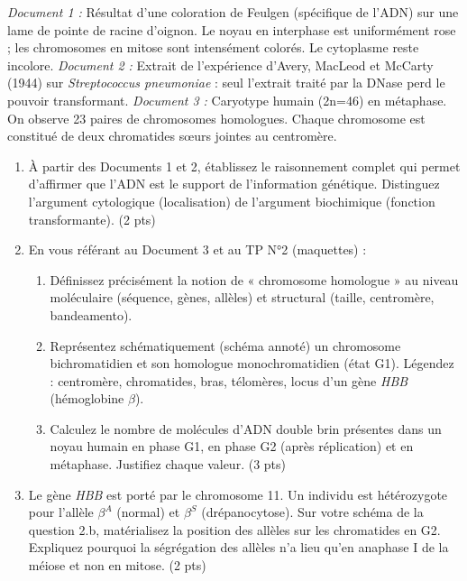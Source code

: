 \documentclass[11pt]{article}
\begin{document}
\begin{exercice}
\emph{Document 1 :} Résultat d'une coloration de Feulgen (spécifique de l'ADN) sur une lame de pointe de racine d'oignon. Le noyau en interphase est uniformément rose ; les chromosomes en mitose sont intensément colorés. Le cytoplasme reste incolore.
\emph{Document 2 :} Extrait de l'expérience d'Avery, MacLeod et McCarty (1944) sur \emph{Streptococcus pneumoniae} : seul l'extrait traité par la DNase perd le pouvoir transformant.
\emph{Document 3 :} Caryotype humain (2n=46) en métaphase. On observe 23 paires de chromosomes homologues. Chaque chromosome est constitué de deux chromatides sœurs jointes au centromère.

\begin{enumerate}
    \item À partir des Documents 1 et 2, établissez le raisonnement complet qui permet d'affirmer que l'ADN est le support de l'information génétique. Distinguez l'argument cytologique (localisation) de l'argument biochimique (fonction transformante). \hfill (2 pts)
    \item En vous référant au Document 3 et au TP N°2 (maquettes) :
    \begin{enumerate}
        \item Définissez précisément la notion de « chromosome homologue » au niveau moléculaire (séquence, gènes, allèles) et structural (taille, centromère, bandeamento).
        \item Représentez schématiquement (schéma annoté) un chromosome bichromatidien et son homologue monochromatidien (état G1). Légendez : centromère, chromatides, bras, télomères, locus d'un gène \emph{HBB} (hémoglobine $\beta$).
        \item Calculez le nombre de molécules d'ADN double brin présentes dans un noyau humain en phase G1, en phase G2 (après réplication) et en métaphase. Justifiez chaque valeur. \hfill (3 pts)
    \end{enumerate}
    \item Le gène \emph{HBB} est porté par le chromosome 11. Un individu est hétérozygote pour l'allèle $\beta^A$ (normal) et $\beta^S$ (drépanocytose). Sur votre schéma de la question 2.b, matérialisez la position des allèles sur les chromatides en G2. Expliquez pourquoi la ségrégation des allèles n'a lieu qu'en anaphase I de la méiose et non en mitose. \hfill (2 pts)
\end{enumerate}
\end{exercice}
\end{document}
